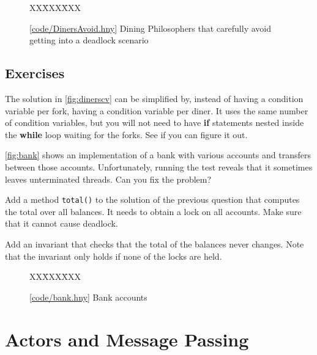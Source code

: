 \documentclass{report}
\newcommand{\harmonysource}[1]{
\begin{tabbing}
XX\=XXX\=XXX\kill
    
\end{tabbing}
}
\newcommand{\harmonylink}[1]{%
[\href{https://harmony.cs.cornell.edu/#1}{\underline{#1}}]%
}
\newenvironment{code}{
\tcolorbox
}{
\endtcolorbox
}
\begin{document}
\begin{figure}
\begin{code}
\harmonysource{DinersAvoid}
\end{code}
\caption{\harmonylink{code/DinersAvoid.hny} Dining Philosophers that carefully avoid getting into a deadlock
scenario}
\label{fig:dinersavoid}
\end{figure}

\section*{Exercises}
\begin{problems}
\item The solution in \autoref{fig:dinerscv} can be simplified by, instead
of having a condition variable per fork, having a condition variable per
diner.  It uses the same number of condition variables, but you will not
need to have \textbf{if} statements nested inside the \textbf{while} loop
waiting for the forks.  See if you can figure it out.
\item \label{ex:bank} \autoref{fig:bank} shows an implementation of a bank with various
accounts and transfers between those accounts.
Unfortunately, running the test reveals that it sometimes leaves unterminated
threads.  Can you fix the problem?
\item Add a method \texttt{total()} to the solution of the previous question
that computes the total over all balances.
It needs to obtain a lock on all accounts.  Make sure that
it cannot cause deadlock.
\item Add an invariant that checks that the total of the balances never
changes.  Note that the invariant only holds if none of the locks are
held.
\end{problems}

\begin{figure}
\begin{code}
\harmonysource{bank}
\end{code}
\caption{\harmonylink{code/bank.hny} Bank accounts}
\label{fig:bank}
\end{figure}

\chapter{Actors and Message Passing}
\label{ch:actor}
%
%

%
\end{document}
